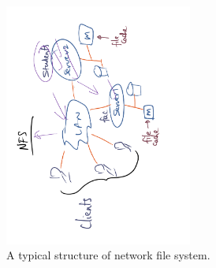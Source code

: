 \documentclass[11pt]{lecture}
\def\fullsize{0.55\textwidth}
\begin{document}
\begin{figure}[!htb]
\centering
\includegraphics[width=\fullsize]{Figures/nfs}
\caption{A typical structure of network file system.}\label{fig: nfs}
\end{figure}
\end{document}
